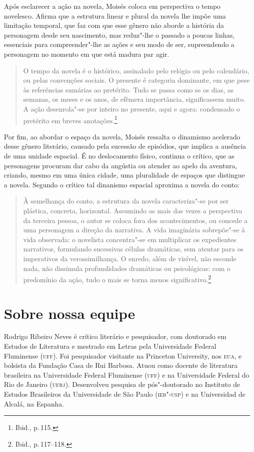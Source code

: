 Após esclarecer a ação na novela, Moisés coloca em perspectiva o tempo novelesco. Afirma que a estrutura linear e plural da novela lhe impõe uma limitação temporal, que faz com que esse gênero não aborde a história da personagem desde seu nascimento, mas reduz"-lhe o passado a poucas linhas, essenciais para compreender"-lhe as ações e seu modo de ser, supreendendo a personagem no momento em que está madura par agir.

\begin{quote}
O tempo da novela é o histórico, assinalado pelo relógio ou pelo calendário, ou pelas convenções sociais. O presente é categoria dominante, em que pese às referências sumárias ao pretérito. Tudo se passa como se os dias, as semanas, os meses e os anos, de efêmera importância, significassem muito. A ação desenrola"-se por inteiro no presente, aqui e agora: condensado o pretérito em breves anotações.\footnote{Ibid., p.\,115.}
\end{quote}

Por fim, ao abordar o espaço da novela, Moisés ressalta o dinamismo acelerado desse gênero literário, causado pela sucessão de episódios, que implica a ausência de uma unidade espacial. É no deslocamento físico, continua o crítico, que as personagens procuram dar cabo da angústia ou atender ao apelo da aventura, criando, mesmo em uma única cidade, uma pluralidade de espaços que distingue a novela. Segundo o crítico tal dinanismo espacial aproxima a novela do conto:

\begin{quote}
À semelhança do conto, a estrutura da novela caracteriza"-se por ser plástica, concreta, horizontal. Assumindo as mais das vezes a perspectiva da terceira pessoa, o autor se coloca fora dos acontecimentos, ou concede a uma personagem a direção da narrativa. A vida imaginária sobrepõe"-se à vida observada: o novelista concentra"-se em multiplicar os expedientes narrativos, formulando sucessivas células dramáticas, sem atentar para os imperativos da verossimilhança. O enredo, além de visível, não esconde nada, não dissimula profundidades dramáticas ou psicológicas: com o predomínio da ação, tudo o mais se torna menos significativo.\footnote{Ibid., p.\,117--118.}
\end{quote}

\section*{Sobre nossa equipe}

Rodrigo Ribeiro Neves é crítico literário e pesquisador, com doutorado em Estudos de Literatura e mestrado em Letras pela Universidade Federal Fluminense (\textsc{uff}). Foi pesquisador visitante na Princeton University, nos \textsc{eua}, e bolsista da Fundação Casa de Rui Barbosa. Atuou como docente de literatura brasileira na Universidade Federal Fluminense (\textsc{uff}) e na Universidade Federal do Rio de Janeiro (\textsc{ufrj}). Desenvolveu pesquisa de pós"-doutorado no Instituto de Estudos Brasileiros da Universidade de São Paulo (\textsc{ieb"-usp}) e na Universidad de Alcalá, na Espanha.
